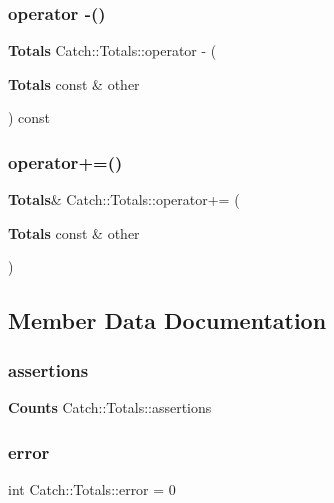 \mbox{\label{struct_catch_1_1_totals_a4e78ceccf9473cbb117e1803907e174d}} 
\subsubsection{operator -\/()}
{\footnotesize\ttfamily \textbf{ Totals} Catch\+::\+Totals\+::operator -\/ (\begin{DoxyParamCaption}\item[{\textbf{ Totals} const \&}]{other }\end{DoxyParamCaption}) const}

\mbox{\label{struct_catch_1_1_totals_a574015076e54cc405c70b053e3356e43}} 
\subsubsection{operator+=()}
{\footnotesize\ttfamily \textbf{ Totals}\& Catch\+::\+Totals\+::operator+= (\begin{DoxyParamCaption}\item[{\textbf{ Totals} const \&}]{other }\end{DoxyParamCaption})}



\subsection{Member Data Documentation}
\mbox{\label{struct_catch_1_1_totals_a885ded66df752147b30c3d45aa602ec9}} 
\subsubsection{assertions}
{\footnotesize\ttfamily \textbf{ Counts} Catch\+::\+Totals\+::assertions}

\mbox{\label{struct_catch_1_1_totals_a6ea14c7de7ea735a14f172a26e08a239}} 
\subsubsection{error}
{\footnotesize\ttfamily int Catch\+::\+Totals\+::error = 0}

